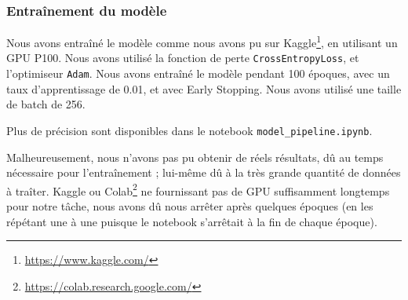 \subsubsection{Entraînement du modèle}
\label{subsubsec:train}
Nous avons entraîné le modèle comme nous avons pu sur Kaggle\footnote{\url{https://www.kaggle.com/}}, en utilisant un GPU P100. Nous avons utilisé la fonction de perte \texttt{CrossEntropyLoss}, et l'optimiseur \texttt{Adam}. Nous avons entraîné le modèle pendant 100 époques, avec un taux d'apprentissage de 0.01, et avec Early Stopping. Nous avons utilisé une taille de batch de 256.

Plus de précision sont disponibles dans le notebook \texttt{model\_pipeline.ipynb}.

Malheureusement, nous n'avons pas pu obtenir de réels résultats, dû au temps nécessaire pour l'entraînement ; lui-même dû à la très grande quantité de données à traîter. Kaggle ou Colab\footnote{\url{https://colab.research.google.com/}} ne fournissant pas de GPU suffisamment longtemps pour notre tâche, nous avons dû nous arrêter après quelques époques (en les répétant une à une puisque le notebook s'arrêtait à la fin de chaque époque).